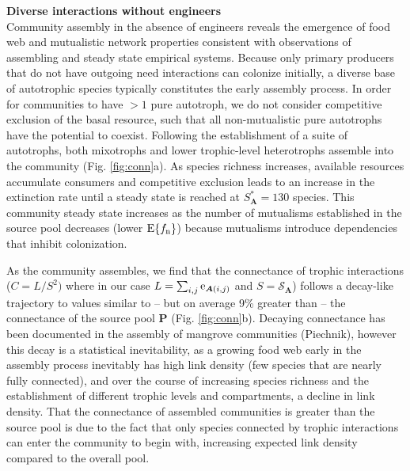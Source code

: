 \documentclass[9pt,twocolumn,twoside]{pnas-new}
\newcommand{\rr}[1]{{\rm #1}}
\begin{document}





\noindent \textbf{Diverse interactions without engineers} \\
\noindent Community assembly in the absence of engineers reveals the emergence of food web and mutualistic network properties consistent with observations of assembling and steady state empirical systems.
Because only primary producers that do not have outgoing need interactions can colonize initially, a diverse base of autotrophic species typically constitutes the early assembly process.
In order for communities to have $>1$ pure autotroph, we do not consider competitive exclusion of the basal resource, such that all non-mutualistic pure autotrophs have the potential to coexist.
Following the establishment of a suite of autotrophs, both mixotrophs and lower trophic-level heterotrophs assemble into the community (Fig. \ref{fig:conn}a).
As species richness increases, available resources accumulate consumers and competitive exclusion leads to an increase in the extinction rate until a steady state is reached at $S^*_{\bm A}=130$ species.
This community steady state increases as the number of mutualisms established in the source pool decreases (lower $\rr{E}\{f_\rr{n}\}$) because mutualisms introduce dependencies that inhibit colonization.


As the community assembles, we find that the connectance of trophic interactions ($C=L/S^2)$ where in our case $L=\sum_{i,j} \rr{e}_{{\bm A}(i,j)}$ and $S = \mathcal{S}_{\bm A}$) follows a decay-like trajectory to values similar to -- but on average 9\% greater than -- the connectance of the source pool $\bm{P}$ (Fig. \ref{fig:conn}b).
Decaying connectance has been documented in the assembly of mangrove communities (Piechnik), however this decay is a statistical inevitability, as a growing food web early in the assembly process inevitably has high link density (few species that are nearly fully connected), and over the course of increasing species richness and the establishment of different trophic levels and compartments, a decline in link density.
That the connectance of assembled communities is greater than the source pool is due to the fact that only species connected by trophic interactions can enter the community to begin with, increasing expected link density compared to the overall pool.
\end{document}
